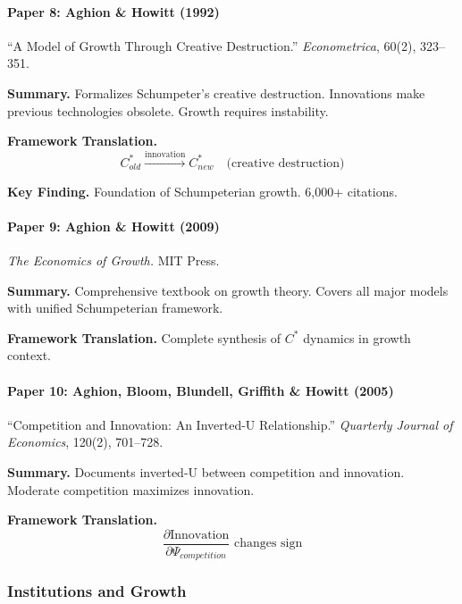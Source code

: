 \paragraph{Paper 8: Aghion \& Howitt (1992)}

``A Model of Growth Through Creative Destruction.''
\textit{Econometrica}, 60(2), 323--351.

\textbf{Summary.}
Formalizes Schumpeter's creative destruction. Innovations make previous 
technologies obsolete. Growth requires instability.

\textbf{Framework Translation.}
\begin{equation}
C^*_{old} \xrightarrow{\text{innovation}} C^*_{new} \quad \text{(creative destruction)}
\end{equation}

\textbf{Key Finding.}
Foundation of Schumpeterian growth. 6,000+ citations.

\paragraph{Paper 9: Aghion \& Howitt (2009)}

\textit{The Economics of Growth.}
MIT Press.

\textbf{Summary.}
Comprehensive textbook on growth theory. Covers all major models with 
unified Schumpeterian framework.

\textbf{Framework Translation.}
Complete synthesis of $C^*$ dynamics in growth context.

\paragraph{Paper 10: Aghion, Bloom, Blundell, Griffith \& Howitt (2005)}

``Competition and Innovation: An Inverted-U Relationship.''
\textit{Quarterly Journal of Economics}, 120(2), 701--728.

\textbf{Summary.}
Documents inverted-U between competition and innovation. Moderate competition 
maximizes innovation.

\textbf{Framework Translation.}
\begin{equation}
\frac{\partial \text{Innovation}}{\partial \Psi_{competition}} \text{ changes sign}
\end{equation}

\subsubsection{Institutions and Growth}


